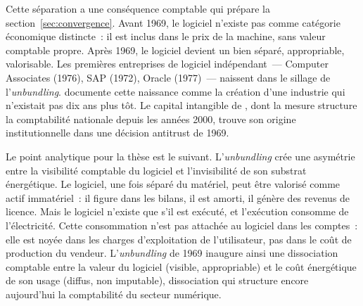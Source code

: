 %
Cette séparation a une conséquence comptable qui prépare la section~\ref{sec:convergence}. Avant 1969, le logiciel n'existe pas comme catégorie économique distincte~: il est inclus dans le prix de la machine, sans valeur comptable propre. Après 1969, le logiciel devient un bien séparé, appropriable, valorisable. Les premières entreprises de logiciel indépendant~--- Computer Associates (1976), SAP (1972), Oracle (1977)~--- naissent dans le sillage de l'\emph{unbundling}. \textcite{campbell-kelly_software_2003} documente cette naissance comme la création d'une industrie qui n'existait pas dix ans plus tôt. Le capital intangible de \textcite{corrado_intangible_2005}, dont la mesure structure la comptabilité nationale depuis les années 2000, trouve son origine institutionnelle dans une décision antitrust de 1969.

%
Le point analytique pour la thèse est le suivant. L'\emph{unbundling} crée une asymétrie entre la visibilité comptable du logiciel et l'invisibilité de son substrat énergétique. Le logiciel, une fois séparé du matériel, peut être valorisé comme actif immatériel~: il figure dans les bilans, il est amorti, il génère des revenus de licence. Mais le logiciel n'existe que s'il est exécuté, et l'exécution consomme de l'électricité. Cette consommation n'est pas attachée au logiciel dans les comptes~: elle est noyée dans les charges d'exploitation de l'utilisateur, pas dans le coût de production du vendeur. L'\emph{unbundling} de 1969 inaugure ainsi une dissociation comptable entre la valeur du logiciel (visible, appropriable) et le coût énergétique de son usage (diffus, non imputable), dissociation qui structure encore aujourd'hui la comptabilité du secteur numérique.



